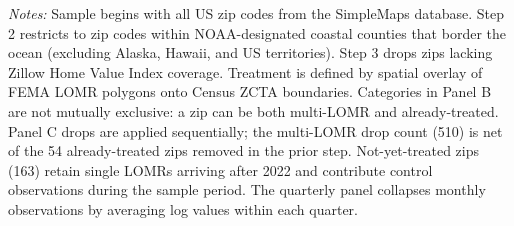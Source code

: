 \begin{table}[!htbp]
\begin{threeparttable}
\begin{tablenotes}
\item \textit{Notes:} Sample begins with all US zip codes from the SimpleMaps database. Step 2 restricts to zip codes within NOAA-designated coastal counties that border the ocean (excluding Alaska, Hawaii, and US territories). Step 3 drops zips lacking Zillow Home Value Index coverage. Treatment is defined by spatial overlay of FEMA LOMR polygons onto Census ZCTA boundaries. Categories in Panel B are not mutually exclusive: a zip can be both multi-LOMR and already-treated. Panel C drops are applied sequentially; the multi-LOMR drop count (510) is net of the 54 already-treated zips removed in the prior step. Not-yet-treated zips (163) retain single LOMRs arriving after 2022 and contribute control observations during the sample period. The quarterly panel collapses monthly observations by averaging log values within each quarter.
\end{tablenotes}
\end{threeparttable}
\end{table}

